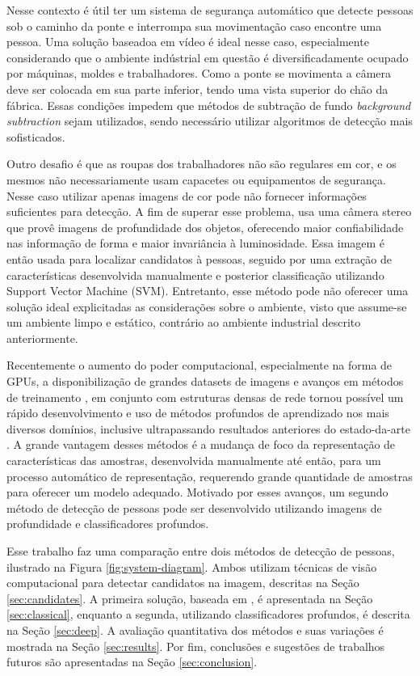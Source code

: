   Nesse contexto é útil ter um sistema de segurança automático que detecte pessoas sob o caminho da ponte e interrompa sua movimentação caso encontre uma pessoa. Uma solução baseadoa em vídeo é ideal nesse caso, especialmente considerando que o ambiente indústrial em questão é diversificadamente ocupado por máquinas, moldes e trabalhadores. Como a ponte se movimenta a câmera deve ser colocada em sua parte inferior, tendo uma vista superior do chão da fábrica. Essas condições impedem que métodos de subtração de fundo \textit{background subtraction} sejam utilizados, sendo necessário utilizar algoritmos de detecção mais sofisticados.

  Outro desafio é que as roupas dos trabalhadores não são regulares em cor, e os mesmos não necessariamente usam capacetes ou equipamentos de segurança. Nesse caso utilizar apenas imagens de cor pode não fornecer informações suficientes para detecção. A fim de superar esse problema, \cite{rauter} usa uma câmera stereo que provê imagens de profundidade dos objetos, oferecendo maior confiabilidade nas informação de forma e maior invariância à luminosidade. Essa imagem é então usada para localizar candidatos à pessoas, seguido por uma extração de características desenvolvida manualmente e posterior classificação utilizando Support Vector Machine (SVM). Entretanto, esse método pode não oferecer uma solução ideal explicitadas as considerações sobre o ambiente, visto que assume-se um ambiente limpo e estático, contrário ao ambiente industrial descrito anteriormente.

  Recentemente o aumento do poder computacional, especialmente na forma de GPUs, a disponibilização de grandes datasets de imagens e avanços em métodos de treinamento \cite{nair2010relu}, em conjunto com estruturas densas de rede \cite{NIPS2013_5207} tornou possível um rápido desenvolvimento e uso de métodos profundos de aprendizado nos mais diversos domínios, inclusive ultrapassando resultados anteriores do estado-da-arte \cite{hintonCONVNET}. A grande vantagem desses métodos é a mudança de foco da representação de características das amostras, desenvolvida manualmente até então, para um processo automático de representação, requerendo grande quantidade de amostras para oferecer um modelo adequado. Motivado por esses avanços, um segundo método de detecção de pessoas pode ser desenvolvido utilizando imagens de profundidade e classificadores profundos.

  Esse trabalho faz uma comparação entre dois métodos de detecção de pessoas, ilustrado na Figura \ref{fig:system-diagram}. Ambos utilizam técnicas de visão computacional para detectar candidatos na imagem, descritas na Seção \ref{sec:candidates}. A primeira solução, baseada em \cite{rauter}, é apresentada na Seção \ref{sec:classical}, enquanto a segunda, utilizando classificadores profundos, é descrita na Seção \ref{sec:deep}. A avaliação quantitativa dos métodos e suas variações é mostrada na Seção \ref{sec:results}. Por fim, conclusões e sugestões de trabalhos futuros são apresentadas na Seção \ref{sec:conclusion}.

